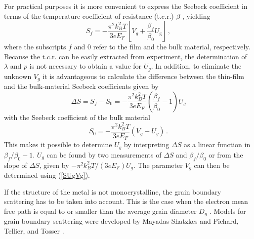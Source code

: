 \documentclass[journal]{IEEEtran}
\newcommand{\mathrmm}[1]{{#1}}
\begin{document}
For practical purposes it is more convenient to express the Seebeck
coefficient in terms of the temperature coefficient of resistance (t.c.r.)
$\beta$ \cite{leonard1970thermoelectric}, yielding
%
\begin{equation}
S_{\mathrmm{f}}=-\frac{\pi^{2}k_{\mathrmm{B}}^2T}{3eE_{\mathrmm{F}}}
			\left[V_{\mathrmm{g}}
			+\frac{\beta_{\mathrmm{f}}}{\beta_{\mathrmm{0}}}
			U_{\mathrm{g}}\right] \, ,
\label{STCR}
\end{equation}
%
where the subscripts $\mathrmm{f}$ and $\mathrmm{0}$ refer to the film and the
bulk material, respectively. Because the t.c.r. can be easily extracted from
experiment, the determination of $\lambda$ and $p$ is not necessary to
obtain a value for $U_{\mathrmm{g}}$. In addition, to eliminate the unknown $V_{\mathrmm{g}}$ it is advantageous to calculate the difference between the thin-film and the bulk-material Seebeck coefficients given by
%
\begin{equation}
\Delta S=S_{\mathrmm{f}}-S_{\mathrmm{0}}=-\frac{\pi^{2}k_{\mathrmm{B}}^2%
T}{3eE_{\mathrmm{F}}}\left(  \frac{\beta_{\mathrmm{f}}}{\beta_{\mathrmm{0}}%
}-1\right)  U_{\mathrmm{g}} \label{deltaS}%
\end{equation}
%
with the Seebeck coefficient of the bulk material
%
\begin{equation}
S_{\mathrmm{0}}=-\frac{\pi^{2}k_{\mathrmm{B}}^2T}{3eE_{\mathrmm{F}}}\left(
V_{\mathrmm{g}}+U_{\mathrmm{g}}\right) \,  . \label{SUgVg}%
\end{equation}
%
This makes it possible to determine $U_{\mathrmm{g}}$ by interpreting $\Delta S$ as a linear function in $\beta_{\mathrmm{f}}/\beta_{\mathrmm{0}}-1$.
$U_{\mathrmm{g}}$ can be found by two measurements of $\Delta S$ and
$\beta_{\mathrmm{f}}/\beta_{\mathrmm{0}}$ or from the slope of $\Delta S$, given
by $-\pi^{2}k_{\mathrmm{B}}^2T/(3eE_{\mathrmm{F}})U_{\mathrmm{g}}$. The
parameter $V_{\mathrmm{g}}$ can then be determined using (\ref{SUgVg}).

If the structure of the metal is not monocrystalline, the grain boundary
scattering has to be taken into account. This is the case when the electron
mean free path is equal to or smaller than the average grain diameter
$D_{\mathrmm{g}}$ \cite{tellier1982size}. Models for grain boundary scattering
were developed by Mayadas-Shatzkes \cite{mayadas1970electrical} and Pichard,
Tellier, and Tosser \cite{pichard1979three}.
\end{document}
